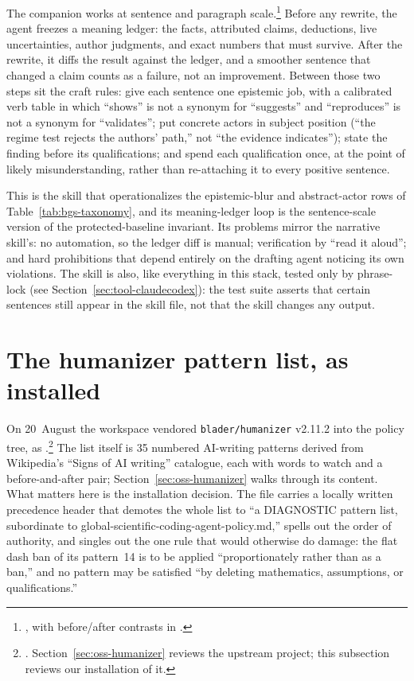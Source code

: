 The companion  works at sentence and
paragraph scale.\footnote{, with before/after contrasts in .}
Before any rewrite, the agent
freezes a meaning ledger: the facts, attributed claims, deductions, live
uncertainties, author judgments, and exact numbers that must survive. After
the rewrite, it diffs the result against the ledger, and a smoother sentence
that changed a claim counts as a failure, not an improvement. Between those
two steps sit the craft rules: give each sentence one epistemic job, with a
calibrated verb table in which ``shows'' is not a synonym for ``suggests''
and ``reproduces'' is not a synonym for ``validates''; put concrete actors in
subject position (``the regime test rejects the authors' path,'' not ``the
evidence indicates''); state the finding before its qualifications; and spend
each qualification once, at the point of likely misunderstanding, rather than
re-attaching it to every positive sentence.

This is the skill that operationalizes the epistemic-blur and abstract-actor
rows of Table~\ref{tab:bgs-taxonomy}, and its meaning-ledger loop is the
sentence-scale version of the protected-baseline invariant. Its problems
mirror the narrative skill's: no automation, so the ledger diff is manual;
verification by ``read it aloud''; and hard prohibitions that depend entirely
on the drafting agent noticing its own violations. The skill is also, like
everything in this stack, tested only by phrase-lock (see
Section~\ref{sec:tool-claudecodex}): the test suite asserts that certain
sentences still appear in the skill file, not that the skill changes any
output.

\section{The humanizer pattern list, as installed}
\label{sec:tool-humanizer}

On 20~August the workspace vendored \texttt{blader/humanizer} v2.11.2 into
the policy tree, as
.\footnote{. Section~\ref{sec:oss-humanizer} reviews the upstream project; this subsection reviews our installation of it.}
The list itself is 35 numbered AI-writing patterns derived from Wikipedia's
``Signs of AI writing'' catalogue, each with words to watch and a
before-and-after pair; Section~\ref{sec:oss-humanizer} walks through its
content. What matters here is the installation decision. The file carries a
locally written precedence header that demotes the whole list to ``a
DIAGNOSTIC pattern list, subordinate to
global-scientific-coding-agent-policy.md,'' spells out the order of
authority, and singles out the one rule that would otherwise do damage: the
flat dash ban of its pattern~14 is to be applied ``proportionately rather
than as a ban,'' and no pattern may be satisfied ``by deleting mathematics,
assumptions, or qualifications.''

